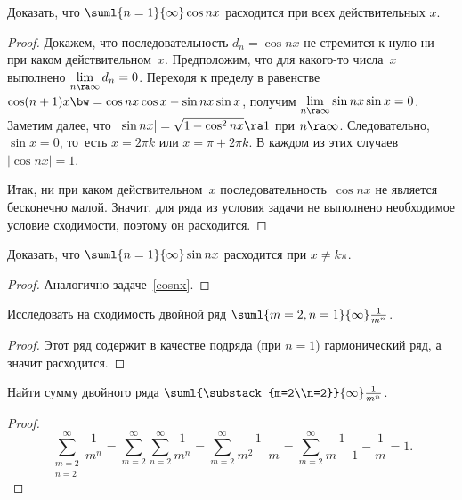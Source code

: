 \documentclass[a4paper]{article}
\begin{document}
\begin{problem}\label{cosnx}
Доказать, что $\suml{n=1}{\infty}\cos nx$ расходится при всех действительных $x$.
\end{problem}

\begin{proof}
Докажем, что последовательность $d_n=\cos nx$ не стремится к нулю ни при каком действительном~$x$.  Предположим,
что для какого-то числа~$x$ выполнено ${\lim\limits_{n\ra\infty}d_n=0}$. Переходя к пределу в
равенстве $\cos(n+1)x \bw= \cos nx\cos x-\sin nx\sin x$, получим ${\lim\limits_{n\ra\infty} \sin nx\sin x=0}$.
Заметим далее, что $|\sin nx|=\sqrt{1-\cos^2 nx}\ra 1$ при $n\ra\infty$.
Следовательно, $\sin x = 0$, то~есть $x=2\pi k$ или $x=\pi+2\pi k$.  В каждом из этих случаев $|\cos nx|=1$.

Итак, ни при каком действительном~$x$ последовательность~$\cos nx$ не является бесконечно малой. Значит, для ряда из
условия задачи не выполнено необходимое условие сходимости, поэтому он расходится.
\end{proof}

\begin{problem}
Доказать, что $\suml{n=1}{\infty}\sin nx$ расходится при $x \neq k\pi$.
\end{problem}

\begin{proof}
Аналогично задаче~\ref{cosnx}.
\end{proof}

\begin{problem}
Исследовать на сходимость двойной ряд $\suml{m=2,n=1}{\infty}\frac{1}{m^n}$.
\end{problem}

\begin{proof}
Этот ряд содержит в качестве подряда (при $n=1$) гармонический ряд, а значит расходится.
\end{proof}

\begin{problem}
Найти сумму двойного ряда $\suml{\substack{m=2\\n=2}}{\infty}\frac{1}{m^n}$.
\end{problem}

\begin{proof}
$$\sum_{\substack{m=2\\n=2}}^{\infty}\frac1{m^n}= \sum_{m=2}^{\infty}\sum_{n=2}^{\infty}\frac1{m^n}=
\sum_{m=2}^{\infty}\frac{1}{m^2-m}= \sum_{m=2}^{\infty}\frac1{m-1}-\frac1m=1.$$
\hfill
\end{proof}
\end{document}
